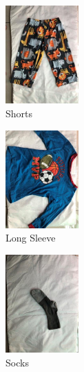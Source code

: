 \documentclass[10pt,journal,compsoc]{IEEEtran}
\begin{document}
\begin{figure}[!htbp]
      \centering
      \includegraphics[width=0.25\textwidth]{Shorts}
      \caption{Shorts}
      \label{fig:Shorts}
\end{figure}

\begin{figure}[!htbp]
      \centering
      \includegraphics[width=0.25\textwidth]{Long_sleeve}
      \caption{Long Sleeve}
      \label{fig:Long_sleeve}
\end{figure}


\begin{figure}[!htbp]
      \centering
      \includegraphics[width=0.25\textwidth]{Socks}
      \caption{Socks}
      \label{fig:Socks}
\end{figure}
\end{document}
